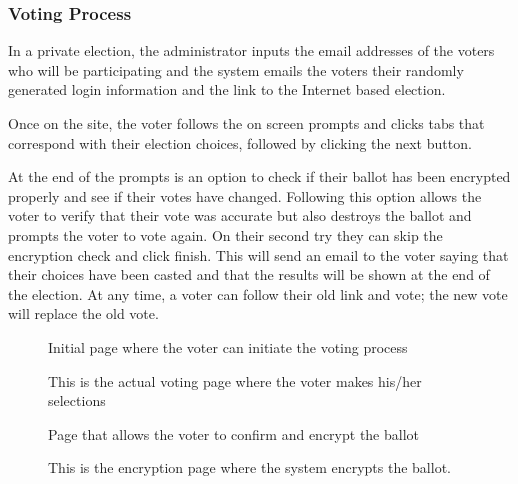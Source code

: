 \subsubsection{Voting Process}

In a private election, the administrator inputs the email addresses of
the voters who will be participating and the system emails the voters
their randomly generated login information and the link to the
Internet based election.

Once on the site, the voter follows the on screen prompts and clicks
tabs that correspond with their election choices, followed by clicking
the next button.

At the end of the prompts is an option to check if their ballot has
been encrypted properly and see if their votes have changed. Following
this option allows the voter to verify that their vote was accurate
but also destroys the ballot and prompts the voter to vote again. On
their second try they can skip the encryption check and click
finish. This will send an email to the voter saying that their choices
have been casted and that the results will be shown at the end of the
election. At any time, a voter can follow their old link and vote; the
new vote will replace the old vote.

\begin{figure}
  \centering {}
  \caption{Initial page where the voter can initiate the voting
    process}
  \label{fig:helios-initial}
\end{figure}

\begin{figure}
  \centering {}
  \caption{This is the actual voting page where the voter makes
    his/her selections}
  \label{fig:helios-voting}
\end{figure}

\begin{figure}
  \centering {}
  \caption{Page that allows the voter to confirm and encrypt the
    ballot}
  \label{fig:helios-confirm}
\end{figure}

\begin{figure}
  \centering {}
  \caption{This is the encryption page where the system encrypts the
    ballot.}
  \label{fig:helios-encrypt}
\end{figure}

